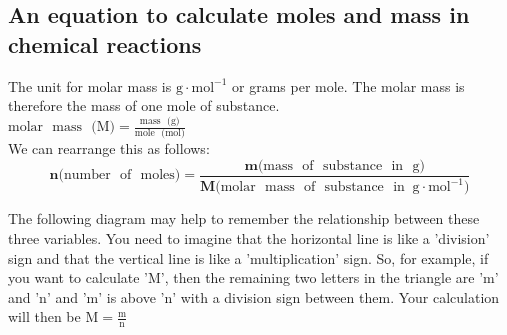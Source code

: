             \subsection*{An equation to calculate moles and mass in chemical reactions}
            \nopagebreak
      \label{m38717*id277432}The unit for molar mass is $\text{g} \cdot \text{mol}^{-1}$ or grams per mole. The molar mass is therefore the mass of one mole of substance. \\
$\text{molar ~mass ~(M)} = \frac{\text{mass ~(g)}}{\text{mole ~(mol)}}$ \\
We can rearrange this as follows:
      \label{m38717*id277436}\nopagebreak\noindent{}
    \begin{equation*}
    \mathbf{n} \text{(number ~of ~moles)} = \frac{\mathbf{m}\text{(mass ~of ~substance ~in ~g)}}{\mathbf{M} \text{(molar ~mass ~of ~substance ~in }~\text{g}\cdot\text{mol}^{-1}\text{)}}
      \end{equation*}
\label{m38717*notfhsst!!!underscore!!!id374}
	\par
      \label{m38717*id277605}The following diagram may help to remember the relationship between these three variables. You need to imagine that the horizontal line is like a 'division' sign and that the vertical line is like a 'multiplication' sign. So, for example, if you want to calculate 'M', then the remaining two letters in the triangle are 'm' and 'n' and 'm' is above 'n' with a division sign between them. Your calculation will then be $\text{M}=\frac{\text{m}}{\text{n}}$\par 
      \label{m38717*id277613}
    \setcounter{subfigure}{0}
	\begin{figure}[H] %
\begin{center}
\end{center}
 \end{figure}       
      \par 
\label{m38717*secfhsst!!!underscore!!!id409}\vspace{-2cm} 
